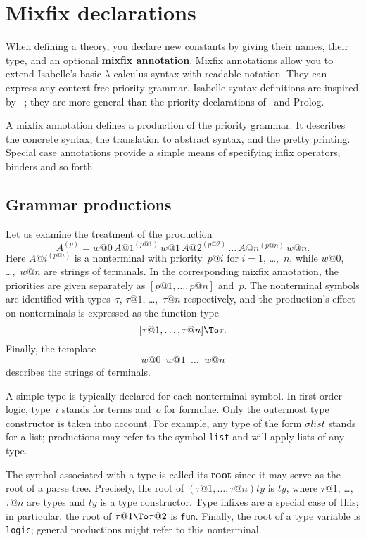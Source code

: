 \section{Mixfix declarations} \label{sec:mixfix}

When defining a theory, you declare new constants by giving their names,
their type, and an optional {\bf mixfix annotation}.  Mixfix annotations
allow you to extend Isabelle's basic $\lambda$-calculus syntax with
readable notation.  They can express any context-free priority grammar.
Isabelle syntax definitions are inspired by \OBJ~\cite{OBJ}; they are more
general than the priority declarations of \ML\ and Prolog.  

A mixfix annotation defines a production of the priority grammar.  It
describes the concrete syntax, the translation to abstract syntax, and the
pretty printing.  Special case annotations provide a simple means of
specifying infix operators, binders and so forth.

\subsection{Grammar productions}\label{sec:grammar}
Let us examine the treatment of the production
\[ A^{(p)}= w@0\, A@1^{(p@1)}\, w@1\, A@2^{(p@2)}\, \ldots\,  
                  A@n^{(p@n)}\, w@n. \]
Here $A@i^{(p@i)}$ is a nonterminal with priority~$p@i$ for $i=1$,
\ldots,~$n$, while $w@0$, \ldots,~$w@n$ are strings of terminals.
In the corresponding mixfix annotation, the priorities are given separately
as $[p@1,\ldots,p@n]$ and~$p$.  The nonterminal symbols are identified with
types~$\tau$, $\tau@1$, \ldots,~$\tau@n$ respectively, and the production's
effect on nonterminals is expressed as the function type
\[ [\tau@1, \ldots, \tau@n]\To \tau. \]
Finally, the template
\[ w@0  \;_\; w@1 \;_\; \ldots \;_\; w@n \]
describes the strings of terminals.

A simple type is typically declared for each nonterminal symbol.  In
first-order logic, type~$i$ stands for terms and~$o$ for formulae.  Only
the outermost type constructor is taken into account.  For example, any
type of the form $\sigma list$ stands for a list;  productions may refer
to the symbol {\tt list} and will apply lists of any type.

The symbol associated with a type is called its {\bf root} since it may
serve as the root of a parse tree.  Precisely, the root of $(\tau@1, \dots,
\tau@n)ty$ is $ty$, where $\tau@1$, \ldots, $\tau@n$ are types and $ty$ is
a type constructor.  Type infixes are a special case of this; in
particular, the root of $\tau@1 \To \tau@2$ is {\tt fun}.  Finally, the
root of a type variable is {\tt logic}; general productions might
refer to this nonterminal.

